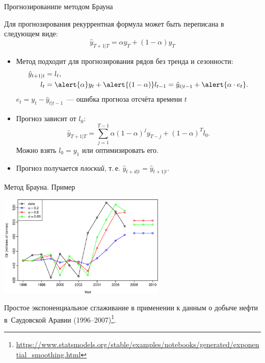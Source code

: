 \documentclass[10pt,pdf,utf8,hyperref={unicode},aspectratio=169]{beamer}
\begin{document}
\begin{frame}{Прогнозированипе методом Брауна}
	
Для прогнозирования рекуррентная формула может быть переписана в следующем виде:
$$
  \hat{y}_{T+1|T} = \alpha y_T + (1-\alpha) \hat{y}_{T}
$$


		\begin{itemize}
			\item Метод подходит для прогнозирования рядов без тренда и сезонности:
			\begin{align*}
			\hat{y}_{t+1|t} &= l_t, \\
			l_t &= \alert{\alpha} y_t + \alert{\left(1-\alpha\right)}l_{t-1}=\hat y_{t|t-1} + \alert{\alpha\cdot e_t}.
			\end{align*}
%
    $e_t = y_t-\hat{y}_{t|t-1}$~--- ошибка прогноза отсчёта времени $t$


			\item Прогноз зависит от $l_0$:
			$$\hat{y}_{T+1|T} = \sum_{j=1}^{T-1}\alpha\left(1-\alpha\right)^j y_{T-j} + \left(1-\alpha\right)^T l_0.$$
			Можно взять $l_0=y_1$ или оптимизировать его.
			\item Прогноз получается \emph{плоский}, т.\,е. $\hat{y}_{t+d|t} = \hat{y}_{t+1|t}$.
		\end{itemize}
\end{frame}
\begin{frame}{Метод Брауна. Пример}
		\begin{center}
			\includegraphics[width=0.6\textwidth]{fig_7_ses}
		\end{center}
		Простое экспоненциальное сглаживание в применении к данным о добыче нефти в~Саудовской Аравии (1996–2007)\footnote{\url{https://www.statsmodels.org/stable/examples/notebooks/generated/exponential_smoothing.html}}.
\end{frame}
\end{document}
